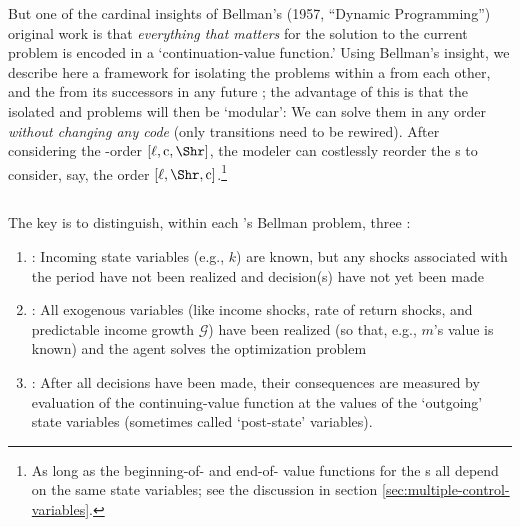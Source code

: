 \documentclass[titlepage, headings=optiontotocandhead]{econtex}
\begin{document}
But one of the cardinal insights of Bellman's (1957, ``Dynamic Programming'') original work is that \emph{everything that matters} for the solution to the current problem is encoded in a `continuation-value function.' %
Using Bellman's insight, we describe here a framework for isolating the {\stg} problems within a {\interval} from each other, and the {\interval} from its successors in any future {\interval}; the advantage of this is that the isolated {\stg} and {\interval} problems will then be `modular': We can solve them in any order \textit{without changing any code} (only transitions need to be rewired). After considering the {\stg}-order $[\ell,\mathrm{c},\Shr]$, the modeler can costlessly reorder the {\stg}s to consider, say, the order $[\ell,\Shr,\mathrm{c}]$.\footnote{As long as the beginning-of-{\stg} and end-of-{\stg} value functions for the {\stg}s all depend on the same state variables; see the discussion in section \ref{sec:multiple-control-variables}.}

\subsection{\Moves}

The key is to distinguish, within each {\stg}'s Bellman problem, three {\moves}:

\begin{enumerate}
\item \textbf{\Arrival}: Incoming state variables (e.g., $k$) are known, but any shocks associated with the period have not been realized and decision(s) have not yet been made
\item \textbf{\Decision}: All exogenous variables (like income shocks, rate of return shocks, and predictable income growth $\mathcal{G}$) have been realized (so that, e.g., $m$'s value is known) and the agent solves the optimization problem
\item \textbf{\Continuation}: After all decisions have been made, their consequences are measured by evaluation of the continuing-value function at the values of the `outgoing' state variables (sometimes called `post-state' variables).
\end{enumerate}
\end{document}
